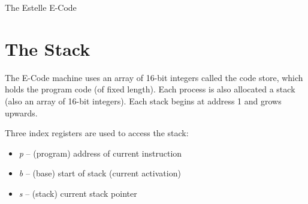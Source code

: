 
\newcommand{\SEX}[2]{
\begin{tabbing}
mmmmmmmmmmmmm\=\kill
{\bf Stack on #1}: $\rightarrow$\>
\+
#2\\
\end{tabbing}
}

\newcommand{\SQEX}[3]{
\begin{tabbing}
mmmmmmmmmmmmm\=\kill
{\em #3:}\\
{\bf Stack on #1}: $\rightarrow$\>
\+
#2\\
\end{tabbing}
}

\newcommand{\SE}[1]{\SEX{Entry}{#1}}

\newcommand{\SX}[1]{\SEX{Exit}{#1}}

\newcommand{\SQE}[2]{\SQEX{Entry}{#2}{#1}}

\newcommand{\SQX}[2]{\SQEX{Exit}{#2}{#1}}

\newcommand{\AC}[1]{
\begin{description}
\item[Action]\mbox{}\\
#1
\end{description}
}

\newcommand{\AL}[1]{
\begin{tabbing}
mmmmmmmm\=mmm\=mmm\=mmm\=mmm\=mmm\=mmm\=mmm\=\kill
{\bf Algorithm:}\>
\+
#1\\
\end{tabbing}
}



{\Large The Estelle E-Code}

\section{The Stack}

The E-Code machine uses an array of 16-bit integers
called the code store, which holds the program code (of
fixed length). Each process is also allocated a stack
(also an array of 16-bit integers). Each stack begins at
address 1 and grows upwards.

Three index registers are used to access the stack:

\begin{itemize}
\item {\em p} -- (program) address of current instruction
\item {\em b} -- (base) start of stack (current activation)
\item {\em s} -- (stack) current stack pointer
\end{itemize}

